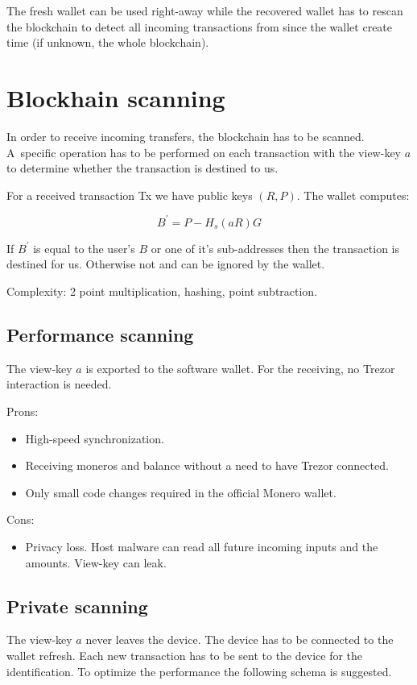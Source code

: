 \documentclass[]{article}
\begin{document}
The fresh wallet can be used right-away while the recovered wallet has to rescan the blockchain to detect all incoming transactions from since the wallet create time (if unknown, the whole blockchain).

\section{Blockhain scanning}

In order to receive incoming transfers, the blockchain has to be scanned. A~specific operation has to be performed on each transaction with the view-key $a$ to determine whether the transaction is destined to us.

For a received transaction Tx we have public keys $\left(R, P\right)$.
The wallet computes: 

\begin{equation}
B^\prime = P - H_s(aR)G
\end{equation}

If $B^\prime$ is equal to the user's $B$ or one of it's sub-addresses then the transaction is destined for us. Otherwise not and can be ignored by the wallet.

Complexity: 2 point multiplication, hashing, point subtraction.

\subsection{Performance scanning} 
The view-key $a$ is exported to the software wallet. For the receiving, no Trezor interaction is needed. 

\noindent Prons:
\begin{itemize}
	\item High-speed synchronization.
	\item Receiving moneros and balance without a need to have Trezor connected.
	\item Only small code changes required in the official Monero wallet.
\end{itemize}

\noindent Cons:
\begin{itemize}
	\item Privacy loss. Host malware can read all future incoming inputs and the amounts. View-key can leak.
\end{itemize}

\subsection{Private scanning}
The view-key $a$ never leaves the device. The device has to be connected
to the wallet refresh. 
Each new transaction has to be sent to the device for the identification.
To optimize the performance the following schema is suggested.
\end{document}

